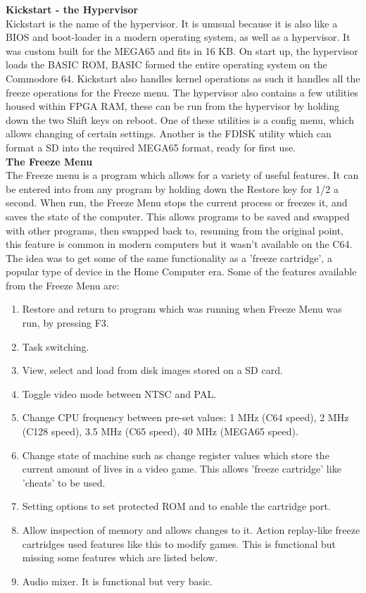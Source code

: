 \textbf{Kickstart - the Hypervisor}\\
Kickstart is the name of the hypervisor. It is unusual because it is also like a BIOS and boot-loader in a modern operating system, as well as a hypervisor. It was custom built for the MEGA65 and fits in 16 KB. On start up, the hypervisor loads the BASIC ROM, BASIC formed the entire operating system on the Commodore 64. Kickstart also handles kernel operations as such it handles all the freeze operations for the Freeze menu. The hypervisor also contains a few utilities housed within FPGA RAM, these can be run from the hypervisor by holding down the two Shift keys on reboot. One of these utilities is a config menu, which allows changing of certain settings. Another is the FDISK utility which can format a SD into the required MEGA65 format, ready for first use.\\

\textbf{The Freeze Menu}\\
The Freeze menu is a program which allows for a variety of useful features. It can be entered into from any program by holding down the Restore key for 1/2 a second. When run, the Freeze Menu stops the current process or freezes it, and saves the state of the computer. This allows programs to be saved and swapped with other programs, then swapped back to, resuming from the original point, this feature is common in modern computers but it wasn't available on the C64. The idea was to get some of the same functionality as a 'freeze cartridge', a popular type of device in the Home Computer era. Some of the features available from the Freeze Menu are:
\begin{enumerate}
\item Restore and return to program which was running when Freeze Menu was run, by pressing F3.
\item Task switching.
\item View, select and load from disk images stored on a SD card.
\item Toggle video mode between NTSC and PAL.
\item Change CPU frequency between pre-set values: 1 MHz (C64 speed), 2 MHz (C128 speed), 3.5 MHz (C65 speed), 40 MHz (MEGA65 speed).
\item Change state of machine such as change register values which store the current amount of lives in a video game. This allows 'freeze cartridge' like 'cheats' to be used.
\item Setting options to set protected ROM and to enable the cartridge port.
\item Allow inspection of memory and allows changes to it. Action replay-like freeze cartridges used features like this to modify games. This is functional but missing some features which are listed below.
\item Audio mixer. It is functional but very basic.
\end{enumerate}

